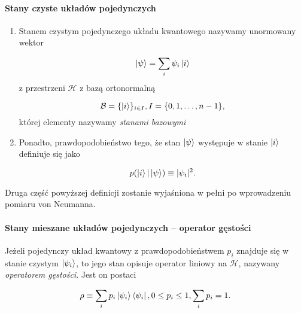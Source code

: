 \paragraph{Stany czyste układów pojedynczych}

\begin{definition}
    \strut
    \begin{enumerate}
        \item Stanem czystym pojedynczego układu kwantowego nazywamy unormowany wektor

            $$
                \ket{\psi} = \sum\limits_{i} \psi_{i} \ket{i}
            $$
            z przestrzeni $\mathcal{H}$ z bazą ortonormalną

            $$
                \mathcal{B} = \{\ket{i}\}_{i \in I}, I = \{0, 1, \ldots, n - 1\},
            $$
            której elementy nazywamy \textit{stanami bazowymi}

        \item Ponadto, prawdopodobieństwo tego, że stan $\ket{\psi}$ występuje w stanie $\ket{i}$ definiuje się jako

            \begin{equation}
                \label{equation:finding}
                p(\ket{i}|\ket{\psi}) \equiv |\psi_i| ^ 2.
            \end{equation}
    \end{enumerate}
\end{definition}

\begin{remark}
    Druga część powyższej definicji zostanie wyjaśniona w pełni po wprowadzeniu pomiaru von Neumanna.
\end{remark}

\paragraph{Stany mieszane układów pojedynczych -- operator gęstości}

\begin{definition}
    Jeżeli pojedynczy układ kwantowy z prawdopodobieństwem $p_i$ znajduje się w stanie czystym $\ket{\psi_i}$, to jego stan opisuje operator liniowy na $\mathcal{H}$, nazywany \textit{operatorem gęstości}. Jest on postaci

    $$
        \rho \equiv \sum\limits_{i} p_i \ket{\psi_i} \bra{\psi_i}, 0 \leq p_i \leq 1, \sum\limits_{i} p_i = 1.
    $$
\end{definition}

